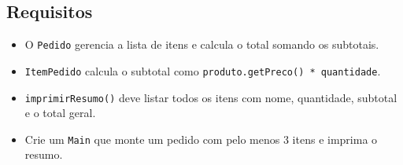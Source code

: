 \documentclass[12pt]{article}
\begin{document}
\subsection*{Requisitos}
\begin{itemize}
    \item O \texttt{Pedido} gerencia a lista de itens e calcula o total somando os subtotais.
    \item \texttt{ItemPedido} calcula o subtotal como \texttt{produto.getPreco() * quantidade}.
    \item \texttt{imprimirResumo()} deve listar todos os itens com nome, quantidade, subtotal e o total geral.
    \item Crie um \texttt{Main} que monte um pedido com pelo menos 3 itens e imprima o resumo.
\end{itemize}
\end{document}
